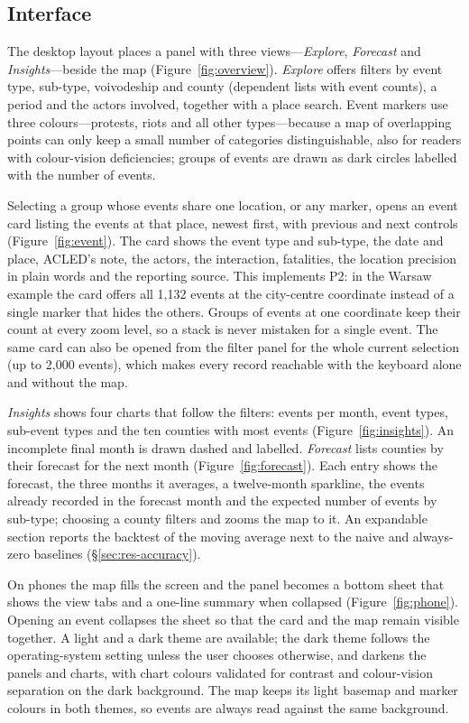 \documentclass[11pt,a4paper]{article}
\begin{document}
\subsection{Interface}

The desktop layout places a panel with three views---\emph{Explore}, \emph{Forecast} and \emph{Insights}---beside the map (Figure~\ref{fig:overview}). \emph{Explore} offers filters by event type, sub-type, voivodeship and county (dependent lists with event counts), a period and the actors involved, together with a place search. Event markers use three colours---protests, riots and all other types---because a map of overlapping points can only keep a small number of categories distinguishable, also for readers with colour-vision deficiencies; groups of events are drawn as dark circles labelled with the number of events.

Selecting a group whose events share one location, or any marker, opens an event card listing the events at that place, newest first, with previous and next controls (Figure~\ref{fig:event}). The card shows the event type and sub-type, the date and place, ACLED's note, the actors, the interaction, fatalities, the location precision in plain words and the reporting source. This implements P2: in the Warsaw example the card offers all 1{,}132 events at the city-centre coordinate instead of a single marker that hides the others. Groups of events at one coordinate keep their count at every zoom level, so a stack is never mistaken for a single event. The same card can also be opened from the filter panel for the whole current selection (up to 2{,}000 events), which makes every record reachable with the keyboard alone and without the map.

\emph{Insights} shows four charts that follow the filters: events per month, event types, sub-event types and the ten counties with most events (Figure~\ref{fig:insights}). An incomplete final month is drawn dashed and labelled. \emph{Forecast} lists counties by their forecast for the next month (Figure~\ref{fig:forecast}). Each entry shows the forecast, the three months it averages, a twelve-month sparkline, the events already recorded in the forecast month and the expected number of events by sub-type; choosing a county filters and zooms the map to it. An expandable section reports the backtest of the moving average next to the naive and always-zero baselines (\S\ref{sec:res-accuracy}).

On phones the map fills the screen and the panel becomes a bottom sheet that shows the view tabs and a one-line summary when collapsed (Figure~\ref{fig:phone}). Opening an event collapses the sheet so that the card and the map remain visible together. A light and a dark theme are available; the dark theme follows the operating-system setting unless the user chooses otherwise, and darkens the panels and charts, with chart colours validated for contrast and colour-vision separation on the dark background. The map keeps its light basemap and marker colours in both themes, so events are always read against the same background.
\end{document}
